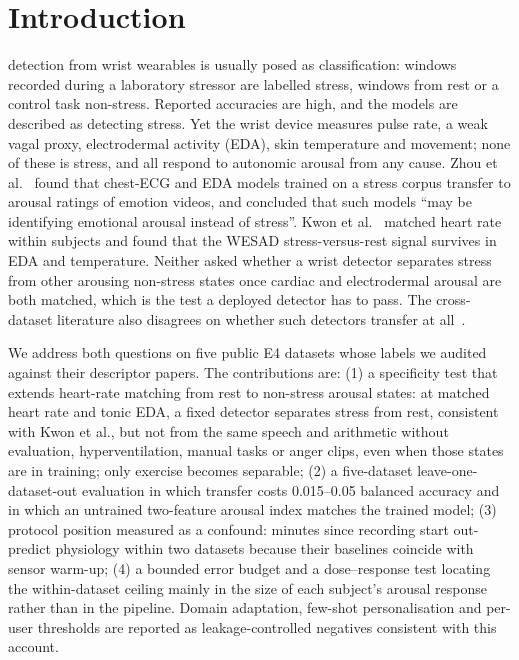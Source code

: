\documentclass[journal]{IEEEtran}
\begin{document}
\section{Introduction}
 detection from wrist wearables is usually posed as classification: windows recorded during a laboratory stressor are labelled stress, windows from rest or a control task non-stress. Reported accuracies are high, and the models are described as detecting stress. Yet the wrist device measures pulse rate, a weak vagal proxy, electrodermal activity (EDA), skin temperature and movement; none of these is stress, and all respond to autonomic arousal from any cause. Zhou et al.~\cite{zhou2023} found that chest-ECG and EDA models trained on a stress corpus transfer to arousal ratings of emotion videos, and concluded that such models ``may be identifying emotional arousal instead of stress''. Kwon et al.~\cite{kwon2026} matched heart rate within subjects and found that the WESAD stress-versus-rest signal survives in EDA and temperature. Neither asked whether a wrist detector separates stress from other arousing non-stress states once cardiac and electrodermal arousal are both matched, which is the test a deployed detector has to pass. The cross-dataset literature also disagrees on whether such detectors transfer at all~\cite{prajod2024,calzametre2026,xiao2025,mishra2020,kwon2026}.

We address both questions on five public E4 datasets whose labels we audited against their descriptor papers. The contributions are:
(1) a specificity test that extends heart-rate matching from rest to non-stress arousal states: at matched heart rate and tonic EDA, a fixed detector separates stress from rest, consistent with Kwon et al., but not from the same speech and arithmetic without evaluation, hyperventilation, manual tasks or anger clips, even when those states are in training; only exercise becomes separable;
(2) a five-dataset leave-one-dataset-out evaluation in which transfer costs 0.015--0.05 balanced accuracy and in which an untrained two-feature arousal index matches the trained model;
(3) protocol position measured as a confound: minutes since recording start out-predict physiology within two datasets because their baselines coincide with sensor warm-up;
(4) a bounded error budget and a dose--response test locating the within-dataset ceiling mainly in the size of each subject's arousal response rather than in the pipeline.
Domain adaptation, few-shot personalisation and per-user thresholds are reported as leakage-controlled negatives consistent with this account.
\end{document}
